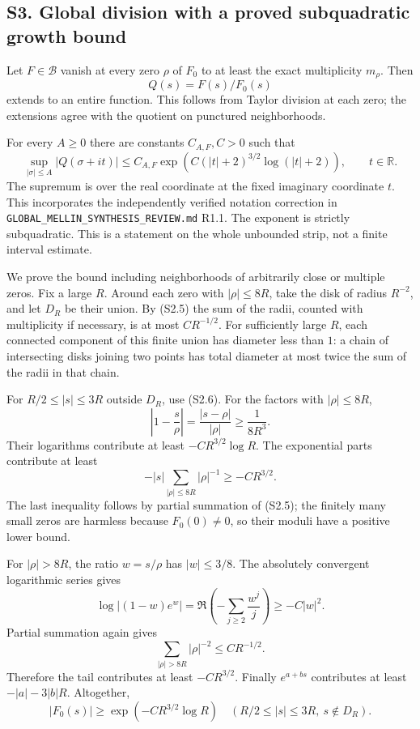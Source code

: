 \documentclass[
]{article}
\begin{document}
\subsection{S3. Global division with a proved subquadratic growth
bound}\label{s3.-global-division-with-a-proved-subquadratic-growth-bound}

Let \(F\in\mathcal B\) vanish at every zero \(\rho\) of \(F_0\) to at
least the exact multiplicity \(m_\rho\). Then \[
Q(s)=F(s)/F_0(s)
\tag{S3.1}
\] extends to an entire function. This follows from Taylor division at
each zero; the extensions agree with the quotient on punctured
neighborhoods.

For every \(A\ge0\) there are constants \(C_{A,F},C>0\) such that \[
\sup_{|\sigma|\le A}|Q(\sigma+it)|
\le C_{A,F}\exp\!\left(C(|t|+2)^{3/2}
\log(|t|+2)\right),\qquad t\in\mathbb R.
\tag{S3.2}
\] The supremum is over the real coordinate at the fixed imaginary
coordinate \(t\). This incorporates the independently verified notation
correction in \nolinkurl{GLOBAL_MELLIN_SYNTHESIS_REVIEW.md} R1.1. The exponent is
strictly subquadratic. This is a statement on the whole unbounded strip,
not a finite interval estimate.

We prove the bound including neighborhoods of arbitrarily close or
multiple zeros. Fix a large \(R\). Around each zero with
\(|\rho|\le8R\), take the disk of radius \(R^{-2}\), and let \(D_R\) be
their union. By (S2.5) the sum of the radii, counted with multiplicity
if necessary, is at most \(C R^{-1/2}\). For sufficiently large \(R\),
each connected component of this finite union has diameter less than
\(1\): a chain of intersecting disks joining two points has total
diameter at most twice the sum of the radii in that chain.

For \(R/2\le|s|\le3R\) outside \(D_R\), use (S2.6). For the factors with
\(|\rho|\le8R\), \[
\left|1-\frac{s}{\rho}\right|
=\frac{|s-\rho|}{|\rho|}\ge\frac1{8R^3}.
\tag{S3.3}
\] Their logarithms contribute at least \(-C R^{3/2}\log R\). The
exponential parts contribute at least \[
-|s|\sum_{|\rho|\le8R}|\rho|^{-1}\ge-C R^{3/2}.
\tag{S3.4}
\] The last inequality follows by partial summation of (S2.5); the
finitely many small zeros are harmless because \(F_0(0)\ne0\), so their
moduli have a positive lower bound.

For \(|\rho|>8R\), the ratio \(w=s/\rho\) has \(|w|\le3/8\). The
absolutely convergent logarithmic series gives \[
\log|(1-w)e^w|
=\Re\left(-\sum_{j\ge2}\frac{w^j}{j}\right)
\ge-C|w|^2.
\] Partial summation again gives \[
\sum_{|\rho|>8R}|\rho|^{-2}\le C R^{-1/2}.
\] Therefore the tail contributes at least \(-C R^{3/2}\). Finally
\(e^{a+bs}\) contributes at least \(-|a|-3|b|R\). Altogether, \[
|F_0(s)|\ge\exp(-C R^{3/2}\log R)
\quad(R/2\le|s|\le3R,\ s\notin D_R).
\tag{S3.5}
\]
\end{document}
